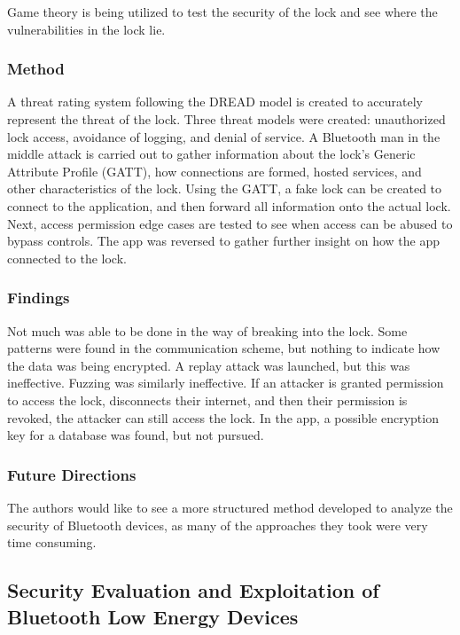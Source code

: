 \documentclass[letterpaper,12pt]{article}
\begin{document}
\noindent
Game theory is being utilized to test the security of the lock and see where the vulnerabilities in the lock lie. 

\subsubsection{Method}

\noindent
A threat rating system following the DREAD model is created to accurately represent the threat of the lock. Three threat models were created: unauthorized lock access, avoidance of logging, and denial of service. A Bluetooth man in the middle attack is carried out to gather information about the lock’s Generic Attribute Profile (GATT), how connections are formed, hosted services, and other characteristics of the lock. Using the GATT, a fake lock can be created to connect to the application, and then forward all information onto the actual lock. Next, access permission edge cases are tested to see when access can be abused to bypass controls. The app was reversed to gather further insight on how the app connected to the lock. 

\subsubsection{Findings}

\noindent
Not much was able to be done in the way of breaking into the lock. Some patterns were found in the communication scheme, but nothing to indicate how the data was being encrypted. A replay attack was launched, but this was ineffective. Fuzzing was similarly ineffective. If an attacker is granted permission to access the lock, disconnects their internet, and then their permission is revoked, the attacker can still access the lock. In the app, a possible encryption key for a database was found, but not pursued. 

\subsubsection{Future Directions}

\noindent
The authors would like to see a more structured method developed to analyze the security of Bluetooth devices, as many of the approaches they took were very time consuming. 

\subsection{Security Evaluation and Exploitation of Bluetooth Low Energy Devices}
\end{document}
